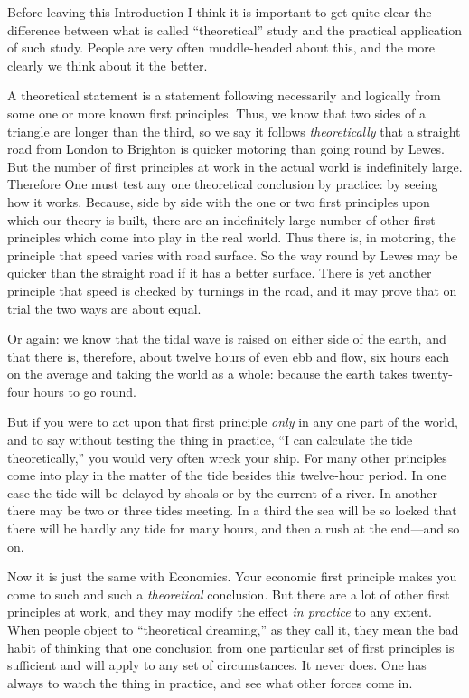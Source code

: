 \documentclass{book}
\begin{document}
Before leaving this Introduction I think it is important to get quite clear the difference between what is called “theoretical” study and the practical application of such study. People are very often muddle-headed about this, and the more clearly we think about it the better.

A theoretical statement is a statement following necessarily and logically from some one or more known first principles. Thus, we know that two sides of a triangle are longer than the third, so we say it follows \emph{theoretically} that a straight road from London to Brighton is quicker motoring than going round by Lewes. But the number of first principles at work in the actual world is indefinitely large. Therefore One must test any one theoretical conclusion by practice: by seeing how it works. Because, side by side with the one or two first principles upon which our theory is built, there are an indefinitely large number of other first principles which come into play in the real world. Thus there is, in motoring, the principle that speed varies with road surface. So the way round by Lewes may be quicker than the straight road if it has a better surface. There is yet another principle that speed is checked by turnings in the road, and it may prove that on trial the two ways are about equal.

Or again: we know that the tidal wave is raised on either side of the earth, and that there is, therefore, about twelve hours of even ebb and flow, six hours each on the average and taking the world as a whole: because the earth takes twenty-four hours to go round.

But if you were to act upon that first principle \emph{only} in any one part of the world, and to say without testing the thing in practice, “I can calculate the tide theoretically,” you would very often wreck your ship. For many other principles come into play in the matter of the tide besides this twelve-hour period. In one case the tide will be delayed by shoals or by the current of a river. In another there may be two or three tides meeting. In a third the sea will be so locked that there will be hardly any tide for many hours, and then a rush at the end—and so on.

Now it is just the same with Economics. Your economic first principle makes you come to such and such a \emph{theoretical} conclusion. But there are a lot of other first principles at work, and they may modify the effect \emph{in practice} to any extent. When people object to “theoretical dreaming,” as they call it, they mean the bad habit of thinking that one conclusion from one particular set of first principles is sufficient and will apply to any set of circumstances. It never does. One has always to watch the thing in practice, and see what other forces come in.
\end{document}

